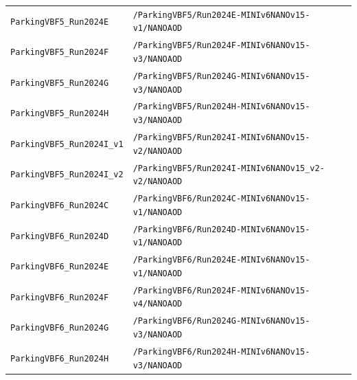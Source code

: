 \begin{longtable}{@{}>{\RaggedRight\arraybackslash}p{} >{\RaggedRight\arraybackslash}p{}@{}}
\texttt{ParkingVBF5\_\allowbreak{}Run2024E} & \texttt{/\allowbreak{}ParkingVBF5/\allowbreak{}Run2024E-\allowbreak{}MINIv6NANOv15-\allowbreak{}v1/\allowbreak{}NANOAOD} \\
\addlinespace[2pt]
\texttt{ParkingVBF5\_\allowbreak{}Run2024F} & \texttt{/\allowbreak{}ParkingVBF5/\allowbreak{}Run2024F-\allowbreak{}MINIv6NANOv15-\allowbreak{}v3/\allowbreak{}NANOAOD} \\
\addlinespace[2pt]
\texttt{ParkingVBF5\_\allowbreak{}Run2024G} & \texttt{/\allowbreak{}ParkingVBF5/\allowbreak{}Run2024G-\allowbreak{}MINIv6NANOv15-\allowbreak{}v3/\allowbreak{}NANOAOD} \\
\addlinespace[2pt]
\texttt{ParkingVBF5\_\allowbreak{}Run2024H} & \texttt{/\allowbreak{}ParkingVBF5/\allowbreak{}Run2024H-\allowbreak{}MINIv6NANOv15-\allowbreak{}v3/\allowbreak{}NANOAOD} \\
\addlinespace[2pt]
\texttt{ParkingVBF5\_\allowbreak{}Run2024I\_\allowbreak{}v1} & \texttt{/\allowbreak{}ParkingVBF5/\allowbreak{}Run2024I-\allowbreak{}MINIv6NANOv15-\allowbreak{}v2/\allowbreak{}NANOAOD} \\
\addlinespace[2pt]
\texttt{ParkingVBF5\_\allowbreak{}Run2024I\_\allowbreak{}v2} & \texttt{/\allowbreak{}ParkingVBF5/\allowbreak{}Run2024I-\allowbreak{}MINIv6NANOv15\_\allowbreak{}v2-\allowbreak{}v2/\allowbreak{}NANOAOD} \\
\addlinespace[2pt]
\texttt{ParkingVBF6\_\allowbreak{}Run2024C} & \texttt{/\allowbreak{}ParkingVBF6/\allowbreak{}Run2024C-\allowbreak{}MINIv6NANOv15-\allowbreak{}v1/\allowbreak{}NANOAOD} \\
\addlinespace[2pt]
\texttt{ParkingVBF6\_\allowbreak{}Run2024D} & \texttt{/\allowbreak{}ParkingVBF6/\allowbreak{}Run2024D-\allowbreak{}MINIv6NANOv15-\allowbreak{}v1/\allowbreak{}NANOAOD} \\
\addlinespace[2pt]
\texttt{ParkingVBF6\_\allowbreak{}Run2024E} & \texttt{/\allowbreak{}ParkingVBF6/\allowbreak{}Run2024E-\allowbreak{}MINIv6NANOv15-\allowbreak{}v1/\allowbreak{}NANOAOD} \\
\addlinespace[2pt]
\texttt{ParkingVBF6\_\allowbreak{}Run2024F} & \texttt{/\allowbreak{}ParkingVBF6/\allowbreak{}Run2024F-\allowbreak{}MINIv6NANOv15-\allowbreak{}v4/\allowbreak{}NANOAOD} \\
\addlinespace[2pt]
\texttt{ParkingVBF6\_\allowbreak{}Run2024G} & \texttt{/\allowbreak{}ParkingVBF6/\allowbreak{}Run2024G-\allowbreak{}MINIv6NANOv15-\allowbreak{}v3/\allowbreak{}NANOAOD} \\
\addlinespace[2pt]
\texttt{ParkingVBF6\_\allowbreak{}Run2024H} & \texttt{/\allowbreak{}ParkingVBF6/\allowbreak{}Run2024H-\allowbreak{}MINIv6NANOv15-\allowbreak{}v3/\allowbreak{}NANOAOD} \\

\end{longtable}
